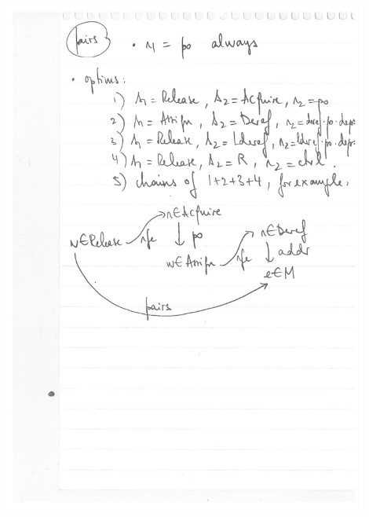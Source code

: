 \documentclass[a4paper]{article}
\begin{document}
\includegraphics[width=12cm]{pairs2}

%
\end{document}
